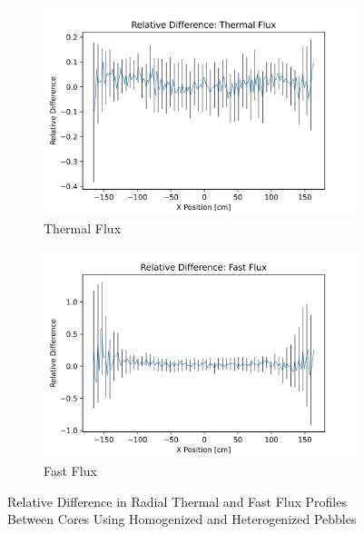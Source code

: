 \begin{figure}[h!]
\centering

\begin{subfigure}{0.45\textwidth}
  \includegraphics[width=0.95\linewidth]{figures/reldiff_therm_flux.png}
  \caption{Thermal Flux}
  \label{fig:diff-therm}
\end{subfigure}%
%
\begin{subfigure}{0.45\textwidth}
  \includegraphics[width=0.95\linewidth]{figures/reldiff_fast_flux.png}
  \caption{Fast Flux}
  \label{fig:diff-fast}
\end{subfigure}

%
\caption{Relative Difference in Radial Thermal and Fast Flux Profiles Between Cores Using Homogenized and Heterogenized Pebbles}
\label{fig:diff-flux}
\end{figure}